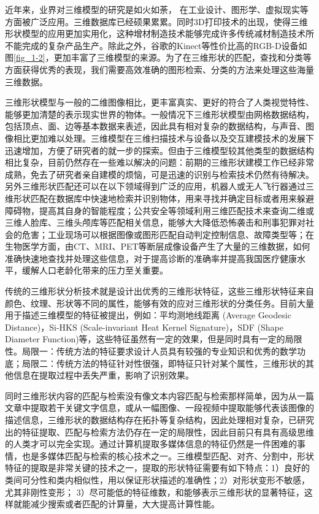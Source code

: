 近年来，业界对三维模型的研究是如火如荼，
在工业设计、图形学、虚拟现实等方面被广泛应用\cite{Tangelder2008A}。三维数据库已经硕果累累。同时3D打印技术的出现，使得三维形状模型的应用更加实用化，这种增材制造技术能够完成许多传统减材制造技术所不能完成的复杂产品生产。除此之外，谷歌的Kinect等性价比高的RGB-D设备如图\ref{fig_1-2}，更加丰富了三维模型的来源。为了在三维形状的匹配，查找和分类等方面获得优秀的表现，我们需要高效准确的图形检索、分类的方法来处理这些海量三维数据。

三维形状模型与一般的二维图像相比，更丰富真实、更好的符合了人类视觉特性、能够更加清楚的表示现实世界的物体。一般情况下三维形状模型由网格数据结构，包括顶点、面、边等基本数据来表述，因此具有相对复杂的数据结构，与声音、图像相比更加难以处理。三维模型在三维扫描技术与设备以及交互建模技术的发展下迅速增加，方便了研究者的就一步的探索。但由于三维模型较其他类型的数据结构相比复杂，目前仍然存在一些难以解决的问题：前期的三维形状建模工作已经非常成熟，免去了研究者亲自建模的烦恼，可是迅速的识别与检索技术仍然有待解决。另外三维形状匹配还可以在以下领域得到广泛的应用，机器人或无人飞行器通过三维形状匹配在数据库中快速地检索并识别物体，用来寻找并确定目标或者用来躲避障碍物，提高其自身的智能程度；公共安全等领域利用三维匹配技术来查询二维或三维人脸库、三维头颅库等匹配相关信息，能够大大降低恐怖袭击和刑事犯罪对社会的危害；工业现场可以根据图像或图形匹配自动判定控制信息、故障类型等；在生物医学方面，由CT、MRI、PET等断层成像设备产生了大量的三维数据，如何准确快速地查找并处理这些信息，对于提高诊断的准确率并提高我国医疗健康水平，缓解人口老龄化带来的压力至关重要。

传统的三维形状分析技术就是设计出优秀的三维形状特征，这些三维形状特征来自颜色、纹理、形状等不同的属性，能够有效的应对三维形状的分类任务。目前大量用于描述三维模型的特征被提出，例如：平均测地线距离 (Average Geodesic Distance)，Si-HKS (Scale-invariant Heat Kernel Signature)，SDF (Shape Diameter Function)等，这些特征虽然有一定的效果，但是同时具有一定的局限性。局限一：传统方法的特征要求设计人员具有较强的专业知识和优秀的数学功底；局限二：传统方法的特征针对性很强，即特征只针对某个属性，三维形状的其他信息在提取过程中丢失严重，影响了识别效果。


同时三维形状内容的匹配与检索没有像文本内容匹配与检索那样简单，因为从一篇文章中提取若干关键文字信息，或从一幅图像、一段视频中提取能够代表该图像的描述信息，三维形状的数据结构存在拓扑等复杂结构，因此处理相对复杂，已研究出的特征提取、匹配与检索方法仍存在一定的局限性，因此目前只有具有高级思维的人类才可以完全实现。通过计算机提取多媒体信息的特征仍然是一件困难的事情，也是多媒体匹配与检索的核心技术之一\cite{Tangelder2008A, Funkhouser2005Shape}。三维模型匹配、对齐、分割中，形状特征的提取是非常关键的技术之一，提取的形状特征需要有如下特点：1）良好的类间可分性和类内相似性，用以保证形状描述的准确性；2）对形状变形不敏感，尤其非刚性变形； 3）尽可能低的特征维数，和能够表示三维形状的显著特征，这样就能减少搜索或者匹配的计算量，大大提高计算性能。


